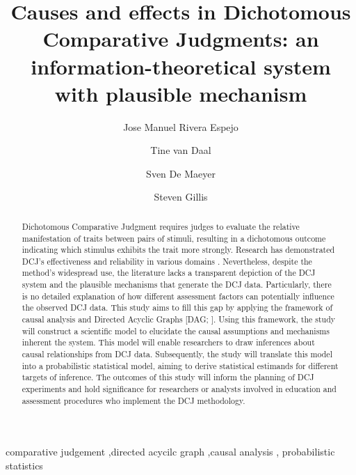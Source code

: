 \documentclass[
  authoryear,
  preprint,
  1p]{elsarticle}
\begin{document}
\begin{frontmatter}
\title{Causes and effects in Dichotomous Comparative Judgments: an
information-theoretical system with plausible mechanism}
\author[1]{Jose Manuel Rivera Espejo%
%
}
\author[1]{Tine van Daal%
%
}
\author[1]{Sven De Maeyer%
%
}
\author[2]{Steven Gillis%
%
}






        
\begin{abstract}
Dichotomous Comparative Judgment
\citep[DCJ,][@Pollitt\_2012b]{Pollitt_2012a} requires judges to evaluate
the relative manifestation of traits between pairs of stimuli, resulting
in a dichotomous outcome indicating which stimulus exhibits the trait
more strongly. Research has demonstrated DCJ's effectiveness and
reliability in various domains
\citep{Pollitt_2012b, Bartholomew_et_al_2018, vanDaal_et_al_2016, Lesterhuis_2018, Bartholomew_et_al_2020, Boonen_et_al_2020}.
Nevertheless, despite the method's widespread use, the literature lacks
a transparent depiction of the DCJ system and the plausible mechanisms
that generate the DCJ data. Particularly, there is no detailed
explanation of how different assessment factors can potentially
influence the observed DCJ data. This study aims to fill this gap by
applying the framework of causal analysis and Directed Acyclic Graphs
{[}DAG; \citet{Pearl_2009}{]}. Using this framework, the study will
construct a scientific model to elucidate the causal assumptions and
mechanisms inherent the system. This model will enable researchers to
draw inferences about causal relationships from DCJ data. Subsequently,
the study will translate this model into a probabilistic statistical
model, aiming to derive statistical estimands for different targets of
inference. The outcomes of this study will inform the planning of DCJ
experiments and hold significance for researchers or analysts involved
in education and assessment procedures who implement the DCJ
methodology.
\end{abstract}





\begin{keyword}
    comparative judgement \sep directed acycilc graph \sep causal
analysis \sep 
    probabilistic statistics
\end{keyword}
\end{frontmatter}
    
\end{document}
